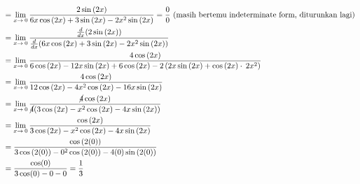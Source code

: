 \documentclass[12pt]{article}
\begin{document}
\begin{fleqn}[2em]
\begin{align*}
{\begin{aligned}
  & = \lim _{x\to \:0} \frac{2\sin \left(2x\right)}{6x\cos \left(2x\right)+3\sin \left(2x\right)-2x^2\sin \left(2x\right)} = \frac{0}{0} \text{ (masih bertemu indeterminate form, diturunkan lagi)} \\
  & = \lim _{x\to \:0} \frac{\frac{d}{dx}(2\sin \left(2x\right))}{\frac{d}{dx}(6x\cos \left(2x\right)+3\sin \left(2x\right)-2x^2\sin \left(2x\right))} \\
  & = \lim _{x\to \:0} \frac{4\cos \left(2x\right)}{6\cos \left(2x\right)-12x\sin \left(2x\right)+6\cos \left(2x\right)-2\left(2x\sin \left(2x\right)+\cos \left(2x\right)\cdot \:2x^2\right)} \\
  & = \lim _{x\to \:0}\frac{4\cos \left(2x\right)}{12\cos \left(2x\right)-4x^2\cos \left(2x\right)-16x\sin \left(2x\right)} \\
  & = \lim _{x\to \:0}\frac{\cancel{4}\cos \left(2x\right)}
    {
      \cancel{4}(3\cos \left(2x\right)-x^2\cos \left(2x\right)-4x\sin \left(2x\right))
    } \\
  & = \lim _{x\to \:0}\frac{\cos \left(2x\right)}
    {3\cos \left(2x\right)-x^2\cos \left(2x\right)-4x\sin \left(2x\right)} \\
  & = \frac{\cos \left(2(0)\right)}
    {3\cos \left(2(0)\right)-0^2\cos \left(2(0)\right)-4(0)\sin \left(2(0)\right)} \\
  & = \frac{\cos(0)}{3\cos(0) - 0 - 0} = \frac{1}{3}
\end{aligned}
}
\end{align*}

\end{fleqn}
\end{document}
